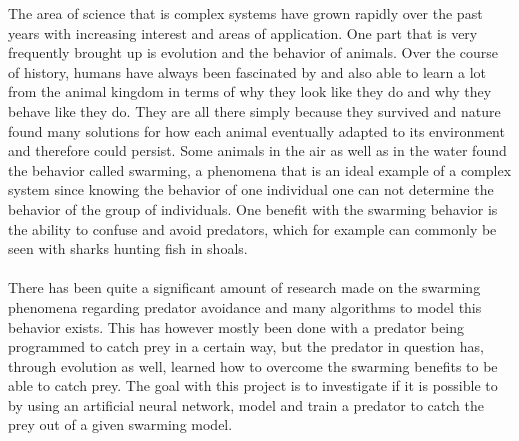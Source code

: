 The area of science that is complex systems have grown rapidly over the past
years with increasing interest and areas of application. One part that is very
frequently brought up is evolution and the behavior of animals. Over the course
of history, humans have always been fascinated by and also able to learn a lot
from the animal kingdom in terms of why they look like they do and why they
behave like they do. They are all there simply because they survived and nature
found many solutions for how each animal eventually adapted to its environment
and therefore could persist. Some animals in the air as well as in the water
found the behavior called swarming, a phenomena that is an ideal example of a
complex system since knowing the behavior of one individual one can not
determine the behavior of the group of individuals. One benefit with the
swarming behavior is the ability to confuse and avoid predators, which for
example can commonly be seen with sharks hunting fish in shoals.\\
\\
There has been quite a significant amount of research made on the swarming
phenomena regarding predator avoidance and many algorithms to model this
behavior exists. This has however mostly been done with a predator being
programmed to catch prey in a certain way, but the predator in question has,
through evolution as well, learned how to overcome the swarming benefits to be
able to catch prey. The goal with this project is to investigate if it is
possible to by using an artificial neural network, model and train a predator
to catch the prey out of a given swarming model.
